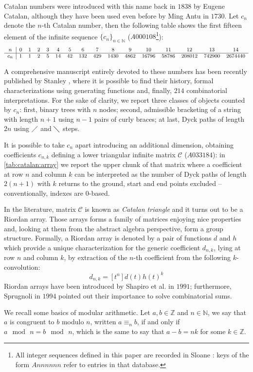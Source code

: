 
\noindent Catalan numbers were introduced with this name back in $1838$ by
Eugene Catalan, although they have been used even before by Ming Antu
in $1730$. Let $c_{n}$ denote the $n$-th Catalan number, then the following
table shows the first fifteen element of the infinite sequence 
$\lbrace c_{n}\rbrace_{n\in\mathbb{N}}$ ($A000108$\footnote{All integer sequences
defined in this paper are recorded in Sloane \cite{sloane:oeis}: keys of
the form $Annnnnn$ refer to entries in that database.}):
\begin{displaymath}
    \footnotesize
    \begin{array}{c|ccccccccccccccc}
        n & 0 & 1 & 2 & 3 & 4 & 5 & 6 & 7 & 8 & 9 & 10 & 11 & 12 & 13 & 14 \\
        \hline
        c_{n} & 1 & 1 & 2 & 5 & 14 & 42 & 132 & 429 & 1430 & 4862 & 16796 & 58786 & 208012 & 742900 & 2674440
    \end{array}
\end{displaymath}

A comprehensive manuscript entirely devoted to these numbers has been recently
published by Stanley \cite{stanley:2015}, where it is possible to find their history,
formal characterizations using generating functions and, finally, $214$ combinatorial 
interpretations.  For the sake of clarity, we report three classes of objects counted by 
$c_{n}$: first, binary trees with $n$ nodes; 
second, admissible bracketing of a string with length $n+1$ using $n-1$ pairs
of curly braces; at last, Dyck paths of length $2n$ using $\diagup$ and $\diagdown$ steps.

It is possible to take $c_{n}$ apart introducing an additional dimension,
obtaining coefficients $c_{n,k}$ defining a lower triangular infinite 
matrix $\mathcal{C}$ ($A033184$): in \autoref{tab:catalan:array} 
we report the upper chunk of that matrix where a coefficient at row $n$ 
and column $k$ can be interpreted as the number
of Dyck paths of length $2(n+1)$ with $k$ returns to the ground, start
and end points excluded -- conventionally, indexes are $0$-based.



In the literature, matrix $\mathcal{C}$ is known as \emph{Catalan triangle} and
it turns out to be a Riordan array. Those arrays forms a family of matrices enjoying
nice properties and, looking at them from the abstract algebra perspective, 
form a group structure. 
Formally, a Riordan array is denoted by a pair of functions $d$ and $h$ which provide a unique 
characterization for the generic coefficient $d_{n,k}$, lying at row $n$ and column $k$, 
by extraction of the $n$-th coefficient from the following $k$-convolution:
\begin{displaymath}
    d_{n,k} = [t^{n}]d(t)h(t)^{k}
\end{displaymath}
Riordan arrays have been introduced by Shapiro et al. \cite{shapiro:1991} in $1991$;
furthermore, Sprugnoli \cite{sprugnoli:1991} in $1994$ pointed out their importance
to solve combinatorial sums.


We recall some basics of modular arithmetic. Let $a,b\in\mathbb{Z}$
and $n\in\mathbb{N}$, we say that $a$ is congruent to $b$ modulo $n$,
written $a \equiv_{n} b$, if and only if $a\mod\,n = b\mod\,n$,
which is the same to say that $a - b = nk$ for some $k\in\mathbb{Z}$.
